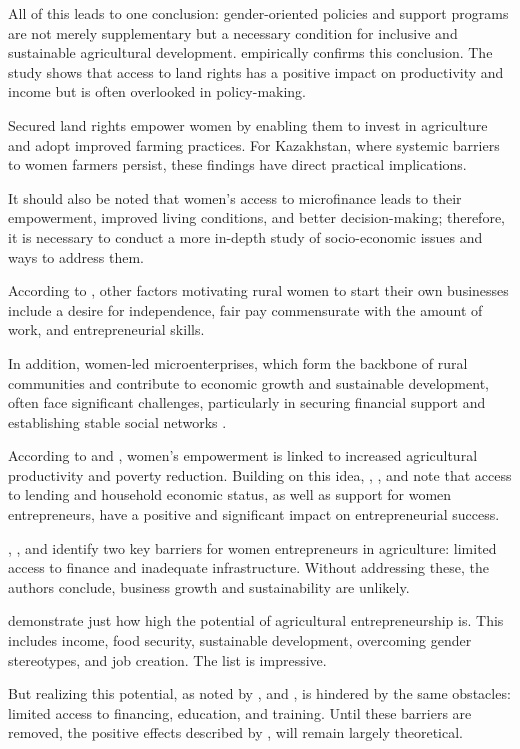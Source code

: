 \documentclass[pdflatex,sn-mathphys-ay]{sn-jnl}
\begin{document}
All of this leads to one conclusion: gender-oriented policies and
support programs are not merely supplementary but a necessary condition
for inclusive and sustainable agricultural development. \citet{ref20} empirically confirms this conclusion. The study shows that
access to land rights has a positive impact on productivity and income
but is often overlooked in policy-making.

Secured land rights empower women by enabling them to invest in
agriculture and adopt improved farming practices. For Kazakhstan, where
systemic barriers to women farmers persist, these findings have direct
practical implications.

It should also be noted that women's access to microfinance
\citep{ref60} leads to their empowerment, improved
living conditions, and better decision-making; therefore, it is
necessary to conduct a more in-depth study of socio-economic issues and
ways to address them.

According to \citet{ref91}, other factors
motivating rural women to start their own businesses include a desire
for independence, fair pay commensurate with the amount of work, and
entrepreneurial skills.

In addition, women-led microenterprises, which form the backbone of
rural communities and contribute to economic growth and sustainable
development, often face significant challenges, particularly in securing
financial support and establishing stable social networks \citep{ref14}.

According to \citet{ref68} and \citet{ref46},
women's empowerment is linked to increased agricultural productivity and
poverty reduction. Building on this idea, \citet{ref94},
\citet{ref88}, and \citet{ref16} note that
access to lending and household economic status, as well as support for
women entrepreneurs, have a positive and significant impact on
entrepreneurial success.

\citet{ref35}, \citet{ref23}, and \citet{ref62} identify two key barriers for women entrepreneurs in
agriculture: limited access to finance and inadequate infrastructure.
Without addressing these, the authors conclude, business growth and
sustainability are unlikely.

\citet{ref99} demonstrate just how high the potential of
agricultural entrepreneurship is. This includes income, food security,
sustainable development, overcoming gender stereotypes, and job
creation. The list is impressive.

But realizing this potential, as noted by \citet{ref25},
and \citet{ref85}, is hindered by the same obstacles:
limited access to financing, education, and training. Until these
barriers are removed, the positive effects described by \citet{ref99}, will remain largely theoretical.
\end{document}
